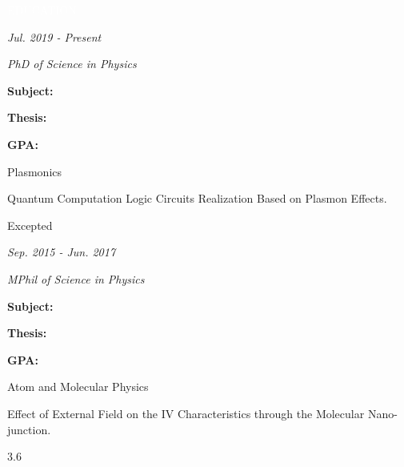 \documentclass[12pt,a4paper,utf8]{report}
\begin{document}
\begin{minipage}[t]{16cm}
    \begin{snugshade}{\textcolor{white}{\textsf{\quad 
            EDUCATION\
    \qquad}}}\end{snugshade}
\end{minipage}\par
\vspace{0.2cm}
    \hfill{\em Jul. 2019 - Present}\qquad\qquad\par
    \qquad\qquad\textit{PhD of Science in Physics}\par
    \begin{minipage}[t]{4cm}
        \qquad \textbf{Subject:}\par
        \qquad \textbf{Thesis:}\par
        \qquad \par
        \qquad \textbf{GPA:}\par
    \end{minipage}
    \begin{minipage}[t]{11cm}
        Plasmonics\par
        Quantum Computation Logic Circuits Realization Based on Plasmon Effects.\par
        Excepted\par
    \end{minipage}\par
\vspace{0.4cm}
    \hfill{\em Sep. 2015 - Jun. 2017}\qquad\qquad\par
    \qquad\qquad\textit{MPhil of Science in Physics}\par
    \begin{minipage}[t]{4cm}
        \qquad \textbf{Subject:}\par
        \qquad \textbf{Thesis:}\par
        \qquad \par
        \qquad \textbf{GPA:}\par
    \end{minipage}
    \begin{minipage}[t]{11cm}
        Atom and Molecular Physics\par
        Effect of External Field on the IV Characteristics through the Molecular Nano-junction.\par
        3.6\par
    \end{minipage}\par
\vspace{0.4cm}
\end{document}
